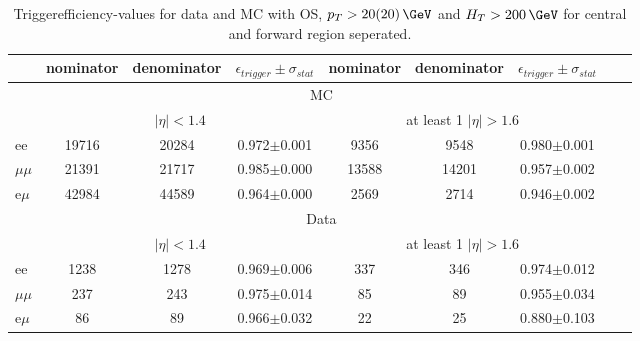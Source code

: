 
\begin{table}[hbp] \caption{Triggerefficiency-values for data and MC with OS, $p_T>20(20)\,\GeV$ and $H_T>200\,\GeV$ for central and forward region seperated.} 
\centering 
\renewcommand{\arraystretch}{1.2} 
\begin{tabular}{|l|c|c|c|c|c|c|c|c|}     
\hline    
 & nominator & denominator & $\epsilon_{trigger} \pm \sigma_{stat}$ &  nominator & denominator & $\epsilon_{trigger} \pm \sigma_{stat}$  \\    
\hline\hline
& \multicolumn{6}{|c|}{MC} \\
\hline
&  \multicolumn{3}{|c|}{$|\eta|<1.4$ } & \multicolumn{3}{|c|}{ at least 1 $|\eta| > 1.6$ } \\
\hline 
ee & 19716 & 20284 & 0.972$\pm$0.001 & 9356 & 9548 & 0.980$\pm$0.001 \\
$\mu\mu$ & 21391 & 21717 & 0.985$\pm$0.000 & 13588 & 14201 & 0.957$\pm$0.002 \\
e$\mu$ & 42984 & 44589 & 0.964$\pm$0.000 & 2569 & 2714 & 0.946$\pm$0.002 \\
    
    \hline 
&\multicolumn{6}{|c|}{Data} \\
\hline
&  \multicolumn{3}{|c|}{$|\eta|<1.4$ } & \multicolumn{3}{|c|}{ at least 1 $|\eta| > 1.6$ }\\
\hline
ee & 1238 & 1278 & 0.969$\pm$0.006 & 337 & 346 & 0.974$\pm$0.012 \\
$\mu\mu$ & 237 & 243 & 0.975$\pm$0.014 & 85 & 89 & 0.955$\pm$0.034 \\
e$\mu$ & 86 & 89 & 0.966$\pm$0.032 & 22 & 25 & 0.880$\pm$0.103 \\
 
 \hline     
\end{tabular}  
\label{tab:EffValues_Seperated}
\end{table}
